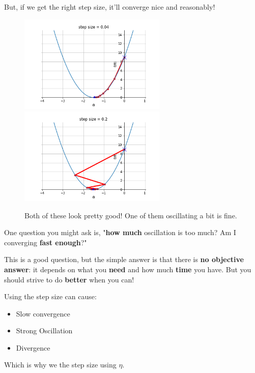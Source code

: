         But, if we get the right step size, it'll converge nice and reasonably!
        
        \begin{figure}[H]
            \includegraphics[width=70mm,scale=0.5]{images/gradient_descent_images/good_converge.png}
            \includegraphics[width=70mm,scale=0.5]{images/gradient_descent_images/good_converge_oscillate.png}

            \caption*{Both of these look pretty good! One of them oscillating a bit is fine.}
        \end{figure}
        
        One question you might ask is, "\textbf{how much} oscillation is too much? Am I converging \textbf{fast enough}?" 
        
        This is a good question, but the simple answer is that there is \textbf{no objective answer}: it depends on what you \textbf{need} and how much \textbf{time} you have. But you should strive to do \textbf{better} when you can!\\
        
        \begin{concept}
            Using the  step size can cause:
            
            \begin{itemize}
                \item Slow convergence
                \item Strong Oscillation
                \item Divergence
            \end{itemize}
            
            Which is why we  the step size using $\eta$.
        \end{concept}
        
